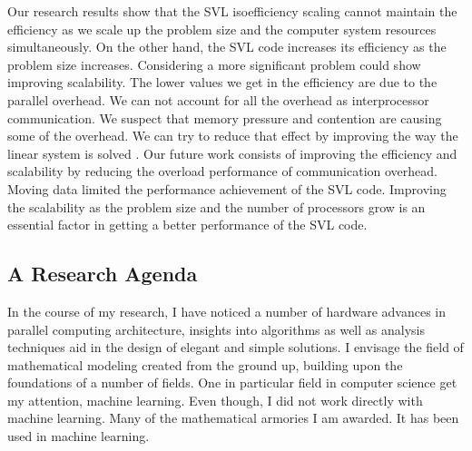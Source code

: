 \documentclass[a4paper, 11pt]{article}
\begin{document}
\begin{small}
Our research results show that the SVL isoefficiency scaling cannot maintain the efficiency as we scale up the problem size and the computer system
resources simultaneously. On the other hand, the SVL code increases its efficiency as the problem size increases. Considering a more significant problem could show improving scalability.
The lower values we get in the efficiency are due to the parallel overhead. We can not account for all the overhead as interprocessor communication.
We suspect that memory pressure and contention are causing some of the overhead. We can try to reduce that effect by improving the way the linear system is solved
\cite{Coronado_Barrientos_Indalecio_Garcia_2018, R_Hunger_2007_FLOPs}.
Our future work consists of improving the efficiency and scalability by reducing the overload performance of communication overhead.
Moving data limited the performance achievement of the SVL code. Improving the scalability as the problem size and the number
of processors grow is an essential factor in getting a better performance of the SVL code.
\subsection*{A Research Agenda}

In the course of my research, I have noticed a number of hardware advances in parallel computing architecture, insights into algorithms as well as analysis techniques
aid in the design of elegant and simple solutions.
I envisage the field of mathematical modeling created from the ground up, building upon the foundations of a number of fields. One in particular field in computer science get my attention, machine learning.
Even though, I did not work directly with machine learning. Many of the mathematical armories I am awarded. It has been used in machine learning.   


\end{small}
\end{document}
